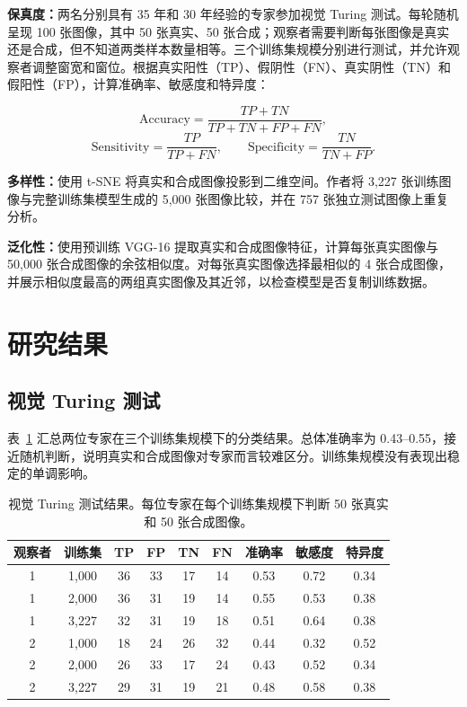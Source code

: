 \documentclass[UTF8,11pt,a4paper]{ctexart}
\begin{document}
\textbf{保真度：}两名分别具有 35 年和 30 年经验的专家参加视觉 Turing 测试。每轮随机呈现 100 张图像，其中 50 张真实、50 张合成；观察者需要判断每张图像是真实还是合成，但不知道两类样本数量相等。三个训练集规模分别进行测试，并允许观察者调整窗宽和窗位。根据真实阳性（TP）、假阴性（FN）、真实阴性（TN）和假阳性（FP），计算准确率、敏感度和特异度：

\begin{equation}
\mathrm{Accuracy}=\frac{TP+TN}{TP+TN+FP+FN},
\end{equation}
\begin{equation}
\mathrm{Sensitivity}=\frac{TP}{TP+FN},\qquad
\mathrm{Specificity}=\frac{TN}{TN+FP}.
\end{equation}

\textbf{多样性：}使用 t-SNE 将真实和合成图像投影到二维空间。作者将 3,227 张训练图像与完整训练集模型生成的 5,000 张图像比较，并在 757 张独立测试图像上重复分析。

\textbf{泛化性：}使用预训练 VGG-16 提取真实和合成图像特征，计算每张真实图像与 50,000 张合成图像的余弦相似度。对每张真实图像选择最相似的 4 张合成图像，并展示相似度最高的两组真实图像及其近邻，以检查模型是否复制训练数据。

\section{研究结果}

\subsection{视觉 Turing 测试}

表~\ref{tab:turing} 汇总两位专家在三个训练集规模下的分类结果。总体准确率为 0.43--0.55，接近随机判断，说明真实和合成图像对专家而言较难区分。训练集规模没有表现出稳定的单调影响。

\begin{table}[htbp]
\centering
\small
\caption{视觉 Turing 测试结果。每位专家在每个训练集规模下判断 50 张真实和 50 张合成图像。}
\label{tab:turing}
\setlength{\tabcolsep}{4pt}
\begin{tabular}{ccccccccc}
\toprule
观察者 & 训练集 & TP & FP & TN & FN & 准确率 & 敏感度 & 特异度\\
\midrule
1 & 1,000 & 36 & 33 & 17 & 14 & 0.53 & 0.72 & 0.34\\
1 & 2,000 & 36 & 31 & 19 & 14 & 0.55 & 0.53 & 0.38\\
1 & 3,227 & 32 & 31 & 19 & 18 & 0.51 & 0.64 & 0.38\\
2 & 1,000 & 18 & 24 & 26 & 32 & 0.44 & 0.32 & 0.52\\
2 & 2,000 & 26 & 33 & 17 & 24 & 0.43 & 0.52 & 0.34\\
2 & 3,227 & 29 & 31 & 19 & 21 & 0.48 & 0.58 & 0.38\\
\bottomrule
\end{tabular}
\end{table}
\end{document}
